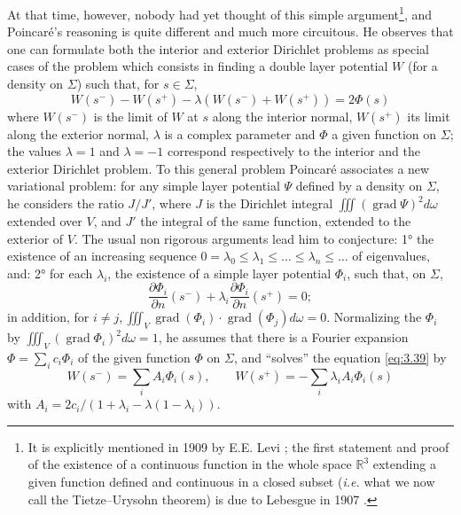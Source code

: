 \documentclass[12pt,a4paper,leqno,twoside]{extbook}
\newcommand{\R}{\mathbb{R}}
\newcommand{\grad}{\operatorname{grad}}
\newcommand{\pder}[2]{\frac{\partial #1}{\partial #2}}
\begin{document}
At that time, however, nobody had yet thought of this simple argument\footnote{It is explicitly mentioned in 1909 by E.E. Levi \cite[vol.~II, p.~302--313]{145}; the first statement and proof of the existence of a continuous function in the whole space \(\R^3\) extending a given function defined and continuous in a closed subset (\emph{i.e.} what we now call the Tietze--Urysohn theorem) is due to Lebesgue in 1907 \cite[vol.~IV, p.~99--100]{138}.}, and Poincaré's reasoning is quite different and much more circuitous. He observes that one can formulate both the interior and exterior Dirichlet problems as special cases of the problem which consists in finding a double layer potential \(W\) (for a density on \(\Sigma\)) such that, for \(s \in \Sigma\),
\begin{equation}
    \label{eq:3.38}
    W(s^-) - W(s^+) - \lambda \left( W(s^-) + W(s^+) \right) = 2\Phi(s)
\end{equation}
where \(W(s^-)\) is the limit of \(W\) at \(s\) along the interior normal, \(W(s^+)\) its limit along the exterior normal, \(\lambda\) is a complex parameter and \(\Phi\) a given function on \(\Sigma\); the values \(\lambda = 1\) and \(\lambda = -1\) correspond respectively to the interior and the exterior Dirichlet problem. To this general problem Poincaré associates a new variational problem: for any simple layer potential \(\Psi\) defined by a density on \(\Sigma\), he considers the ratio \(J/J'\), where \(J\) is the Dirichlet integral \(\iiint (\grad \Psi)^2 d\omega\) extended over \(V\), and \(J'\) the integral of the same function, extended to the exterior of \(V\). The usual non rigorous arguments lead him to conjecture: 1° the existence of an increasing sequence \(0 = \lambda_0 \leq \lambda_1 \leq \ldots \leq \lambda_n \leq \ldots\) of eigenvalues, and: 2° for each \(\lambda_i\), the existence of a simple layer potential \(\Phi_i\), such that, on \(\Sigma\),
\begin{equation}
    \label{eq:3.39}
    \pder{\Phi_i}{n}(s^-) + \lambda_i \pder{\Phi_i}{n}(s^+) = 0;
\end{equation}
in addition, for \(i \neq j, \iiint_V \grad(\Phi_i) \cdot \grad(\Phi_j) d\omega = 0\). Normalizing the \(\Phi_i\) by \(\iiint_V (\grad \Phi_i)^2 d\omega = 1\), he assumes that there is a Fourier expansion \(\Phi = \sum\limits_i c_i \Phi_i\) of the given function \(\Phi\) on \(\Sigma\), and ``solves'' the equation \eqref{eq:3.39} by
\[
    W(s^-) = \sum_i A_i \Phi_i(s), \qquad W(s^+) = -\sum_i \lambda_i A_i \Phi_i(s)
\]
with \(A_i = 2c_i / (1 + \lambda_i - \lambda (1 - \lambda_i))\).
\end{document}
